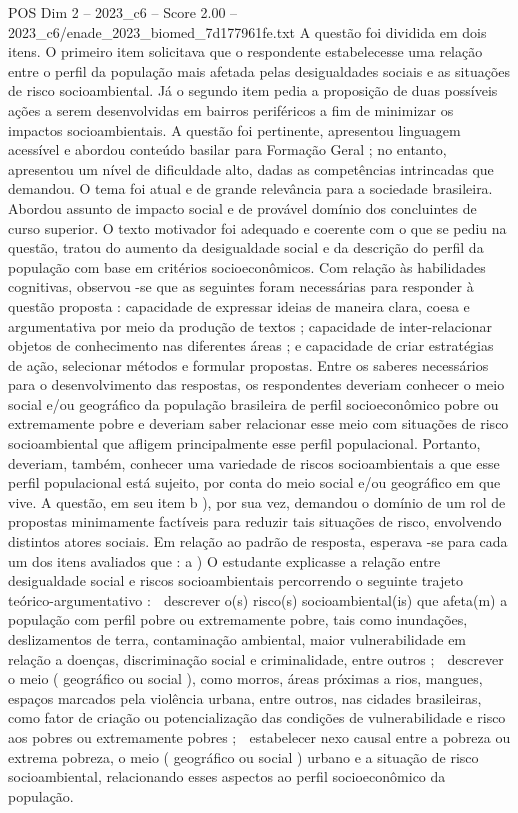 \begin{textsample}{POS Dim 2 – 2023\_c6 – Score 2.00 – 2023\_c6/enade\_2023\_biomed\_7d177961fe.txt}
A questão foi dividida em dois itens.
O primeiro item solicitava que o respondente estabelecesse uma relação entre o perfil da população mais afetada pelas desigualdades sociais e as situações de risco socioambiental.
Já o segundo item pedia a proposição de duas possíveis ações a serem desenvolvidas em bairros periféricos a fim de minimizar os impactos socioambientais.
A questão foi pertinente, apresentou linguagem acessível e abordou conteúdo basilar para Formação Geral ; no entanto, apresentou um nível de dificuldade alto, dadas as competências intrincadas que demandou.
O tema foi atual e de grande relevância para a sociedade brasileira.
Abordou assunto de impacto social e de provável domínio dos concluintes de curso superior.
O texto motivador foi adequado e coerente com o que se pediu na questão, tratou do aumento da desigualdade social e da descrição do perfil da população com base em critérios socioeconômicos.
Com relação às habilidades cognitivas, observou -se que as seguintes foram necessárias para responder à questão proposta : capacidade de expressar ideias de maneira clara, coesa e argumentativa por meio da produção de textos ; capacidade de inter-relacionar objetos de conhecimento nas diferentes áreas ; e capacidade de criar estratégias de ação, selecionar métodos e formular propostas.
Entre os saberes necessários para o desenvolvimento das respostas, os respondentes deveriam conhecer o meio social e/ou geográfico da população brasileira de perfil socioeconômico pobre ou extremamente pobre e deveriam saber relacionar esse meio com situações de risco socioambiental que afligem principalmente esse perfil populacional.
Portanto, deveriam, também, conhecer uma variedade de riscos socioambientais a que esse perfil populacional está sujeito, por conta do meio social e/ou geográfico em que vive.
A questão, em seu item b ), por sua vez, demandou o domínio de um rol de propostas minimamente factíveis para reduzir tais situações de risco, envolvendo distintos atores sociais.
Em relação ao padrão de resposta, esperava -se para cada um dos itens avaliados que : a ) O estudante explicasse a relação entre desigualdade social e riscos socioambientais percorrendo o seguinte trajeto teórico-argumentativo :  descrever o(s) risco(s) socioambiental(is) que afeta(m) a população com perfil pobre ou extremamente pobre, tais como inundações, deslizamentos de terra, contaminação ambiental, maior vulnerabilidade em relação a doenças, discriminação social e criminalidade, entre outros ;  descrever o meio ( geográfico ou social ), como morros, áreas próximas a rios, mangues, espaços marcados pela violência urbana, entre outros, nas cidades brasileiras, como fator de criação ou potencialização das condições de vulnerabilidade e risco aos pobres ou extremamente pobres ;  estabelecer nexo causal entre a pobreza ou extrema pobreza, o meio ( geográfico ou social ) urbano e a situação de risco socioambiental, relacionando esses aspectos ao perfil socioeconômico da população.

\end{textsample}
